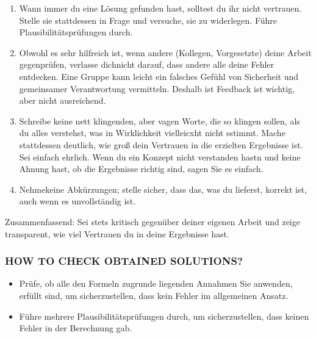 \begin{enumerate}
    \item Wann immer du  eine Lösung gefunden hast, solltest du ihr nicht vertrauen. Stelle sie stattdessen in Frage und versuche, sie zu widerlegen. Führe Plausibilitätsprüfungen durch. 
\item Obwohl es sehr hilfreich ist, wenn andere (Kollegen, Vorgesetzte) deine Arbeit gegenprüfen, verlasse dichnicht darauf, dass andere alle deine Fehler entdecken. Eine Gruppe kann  leicht ein falsches Gefühl von Sicherheit und gemeinsamer Verantwortung vermitteln. Deshalb ist
Feedback ist wichtig, aber nicht ausreichend.
\item Schreibe keine nett klingenden, aber vagen Worte, die so klingen sollen, als du alles verstehst, was in Wirklichkeit vielleicxht nicht sstimmt. Mache stattdessen deutlich, wie groß dein Vertrauen in die erzielten Ergebnisse ist. Sei einfach ehrlich. Wenn du ein Konzept nicht verstanden hastn und keine Ahnung hast, ob die Ergebnisse richtig sind, sagen Sie es einfach. 
\item  Nehmekeine Abkürzungen; stelle sicher, dass das, was du lieferst, korrekt ist, auch wenn es unvollständig ist.  
\end{enumerate}

Zusammenfassend: Sei stets kritisch gegenüber deiner eigenen Arbeit und zeige transparent, wie viel 
Vertrauen du in deine Ergebnisse hast.

\subsubsection{HOW TO CHECK OBTAINED SOLUTIONS?}
\begin{itemize}
    \item Prüfe, ob alle den Formeln zugrunde liegenden Annahmen 
Sie anwenden, erfüllt sind, um sicherzustellen, dass kein 
Fehler im allgemeinen Ansatz.
\item Führe mehrere Plausibilitätsprüfungen durch, um sicherzustellen, dass keinen Fehler in der Berechnung gab.
\end{itemize}


